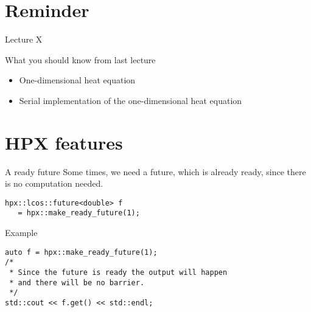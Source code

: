 \documentclass[\classoption]{beamer}
\title{\coursename}
\subtitle{Lecture 13: Futurization of the 1D heat equation}
\author{\tiny Patrick Diehl \orcid{0000-0003-3922-8419}}
\date {
 \tiny \url{\courseurl}
\vspace{2cm}
\doclicenseThis  
  
}
\begin{document}
 {
    \frame {
        \titlepage
    }
}

\frame{

\tableofcontents

}


\section{Reminder}
\begin{frame}{Lecture X}
\begin{block}{What you should know from last lecture}
\begin{itemize}
\item One-dimensional heat equation 
\item Serial implementation of the one-dimensional heat equation
\end{itemize}
\end{block}
\end{frame}

\section{HPX features}

\begin{frame}[fragile]{A ready future}
Some times, we need a future, which is already ready, since there is no computation needed.


\begin{lstlisting}
hpx::lcos::future<double> f 
   = hpx::make_ready_future(1);
\end{lstlisting}

\begin{block}{Example}
\begin{lstlisting}
auto f = hpx::make_ready_future(1);
/* 
 * Since the future is ready the output will happen
 * and there will be no barrier.
 */
std::cout << f.get() << std::endl;
\end{lstlisting}
\end{block}

\end{frame}
\end{document}
